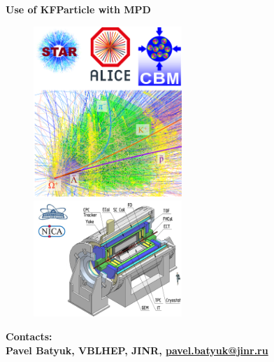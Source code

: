 \documentclass[8pt,a5paper, oldfontcommands]{memoir}
\begin{document}
\clearpage
\thispagestyle{empty}

\begin{huge}
\textbf{Use of KFParticle with MPD}
\end{huge}

\begin{figure}[H]
  \centering
  \includegraphics[width=0.5\textwidth]{img/particlesInCollision.png}
  \includegraphics[width=0.5\textwidth]{img/mpd_addLogos.png}
\end{figure}

\begin{centering}
  \bf
  Contacts: \\
  Pavel Batyuk, VBLHEP, JINR, \url{pavel.batyuk@jinr.ru}
\end{centering}

\newpage


\begin{normalsize}
\tableofcontents
\end{normalsize}

\newpage

\thispagestyle{plain}

\end{document}
